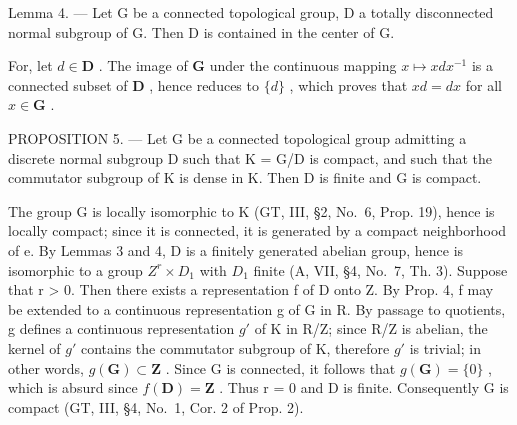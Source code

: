 Lemma 4. --- Let G be a connected topological group, D a totally disconnected normal subgroup of G. Then D is contained in the center of G.

For, let \(d \in \mathbf{D}\) . The image of \(\mathbf{G}\) under the continuous mapping \(x \mapsto x dx^{-1}\) is a connected subset of \(\mathbf{D}\) , hence reduces to \(\{d\}\) , which proves that \(xd = dx\) for all \(x \in \mathbf{G}\) .

PROPOSITION 5. --- Let G be a connected topological group admitting a discrete normal subgroup D such that K = G/D is compact, and such that the commutator subgroup of K is dense in K. Then D is finite and G is compact.

The group G is locally isomorphic to K (GT, III, §2, No.~6, Prop. 19), hence is locally compact; since it is connected, it is generated by a compact neighborhood of e. By Lemmas 3 and 4, D is a finitely generated abelian group, hence is isomorphic to a group \(Z^{r} \times D_{1}\) with \(D_{1}\) finite (A, VII, §4, No.~7, Th. 3). Suppose that r \textgreater{} 0. Then there exists a representation f of D onto Z. By Prop. 4, f may be extended to a continuous representation g of G in R. By passage to quotients, g defines a continuous representation \(g'\) of K in R/Z; since R/Z is abelian, the kernel of \(g'\) contains the commutator subgroup of K, therefore \(g'\) is trivial; in other words, \(g(\mathbf{G}) \subset \mathbf{Z}\) . Since G is connected, it follows that \(g(\mathbf{G}) = \{0\}\) , which is absurd since \(f(\mathbf{D}) = \mathbf{Z}\) . Thus r = 0 and D is finite. Consequently G is compact (GT, III, §4, No.~1, Cor. 2 of Prop. 2).
